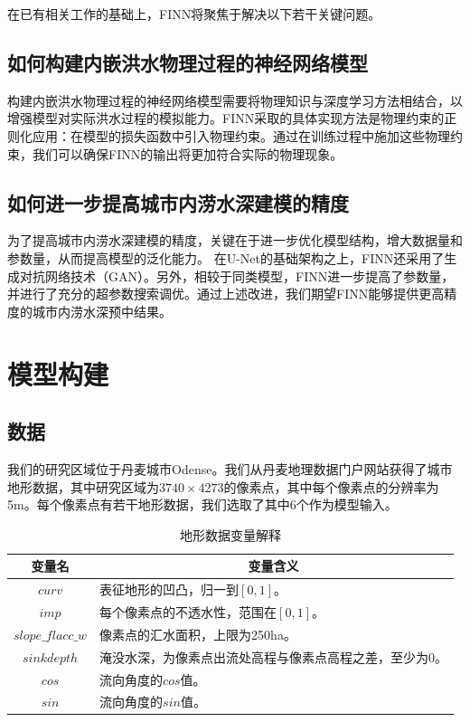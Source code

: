 \documentclass[12pt, a4paper]{article}
\begin{document}
在已有相关工作的基础上，FINN将聚焦于解决以下若干关键问题。

\subsection{如何构建内嵌洪水物理过程的神经网络模型}

构建内嵌洪水物理过程的神经网络模型需要将物理知识与深度学习方法相结合，以增强模型对实际洪水过程的模拟能力。FINN采取的具体实现方法是物理约束的正则化应用：在模型的损失函数中引入物理约束。通过在训练过程中施加这些物理约束，我们可以确保FINN的输出将更加符合实际的物理现象。

\subsection{如何进一步提高城市内涝水深建模的精度}

为了提高城市内涝水深建模的精度，关键在于进一步优化模型结构，增大数据量和参数量，从而提高模型的泛化能力。
在U-Net的基础架构之上，FINN还采用了生成对抗网络技术（GAN）。另外，相较于同类模型，FINN进一步提高了参数量，并进行了充分的超参数搜索调优。通过上述改进，我们期望FINN能够提供更高精度的城市内涝水深预中结果。

\section{模型构建}

\subsection{数据}

我们的研究区域位于丹麦城市Odense。我们从丹麦地理数据门户网站获得了城市地形数据，其中研究区域为$3740\times 4273$的像素点，其中每个像素点的分辨率为5m。每个像素点有若干地形数据，我们选取了其中6个作为模型输入。
\begin{table}[htbp]
    \centering
    \begin{tabular}{|c|l|}
    \hline
    \textbf{变量名} & \multicolumn{1}{c|}{\textbf{变量含义}} \\
    \hline
    $curv$ & 表征地形的凹凸，归一到$[0,1]$。 \\
    \hline
    $imp$ & 每个像素点的不透水性，范围在$[0,1]$。 \\
    \hline
    $slope\_flacc\_w$ & 像素点的汇水面积，上限为250ha。 \\
    \hline
    $sinkdepth$ & 淹没水深，为像素点出流处高程与像素点高程之差，至少为0。 \\
    \hline
    $cos$ & 流向角度的$cos$值。 \\
    \hline
    $sin$ & 流向角度的$sin$值。 \\
    \hline
    \end{tabular}
    \caption{地形数据变量解释}
    \label{t1}
\end{table}
\end{document}
